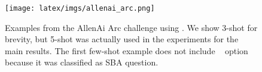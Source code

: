 \begin{figure}[th!]
\centering
\texttt{[image: latex/imgs/allenai\_arc.png]}
\caption{Examples from the AllenAi Arc challenge using \wicd. We show 3-shot for brevity, but 5-shot was actually used in the experiments for the main results. The first few-shot example does not include \nota~ option because it was classified as SBA question.}
\label{fig:arc-examples}
\end{figure} 